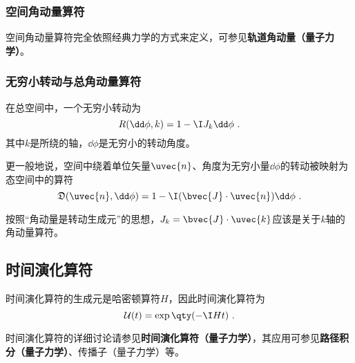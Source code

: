 \subsubsection{空间角动量算符}

空间角动量算符完全依照经典力学的方式来定义，可参见\textbf{轨道角动量（量子力学）}。


\subsubsection{无穷小转动与总角动量算符}


在总空间中，一个无穷小转动为
\begin{equation}
R(\dd \phi, k) = 1-\I J_k\dd \phi~.
\end{equation}
其中$k$是所绕的轴，$\dd \phi$是无穷小的转动角度。

更一般地说，空间中绕着单位矢量$\uvec{n}$、角度为无穷小量$\dd \phi$的转动被映射为态空间中的算符
\begin{equation}
\mathfrak{D}(\uvec{n}, \dd \phi) = 1-\I(\bvec{J}\cdot\uvec{n})\dd \phi~.
\end{equation}

按照“角动量是转动生成元”的思想，$J_k=\bvec{J}\cdot \uvec{k}$应该是关于$k$轴的角动量算符。







\subsection{时间演化算符}


时间演化算符的生成元是哈密顿算符$H$，因此时间演化算符为
\begin{equation}
\mathcal{U}(t) = \exp\qty(-\I H t)~.
\end{equation}

时间演化算符的详细讨论请参见\textbf{时间演化算符（量子力学）}，其应用可参见\textbf{路径积分（量子力学）}、传播子（量子力学）等。


















